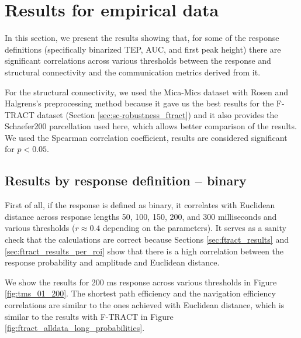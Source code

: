 \section{Results for empirical data}

In this section, we present the results showing that, for some of the response definitions (specifically binarized TEP, AUC, and first peak height) there are significant correlations across various thresholds between the response and structural connectivity and the communication metrics derived from it. 

For the structural connectivity, we used the Mica-Mics dataset with Rosen and Halgrens's preprocessing method because it gave us the best results for the F-TRACT dataset (Section \ref{sec:sc-robustness_ftract}) and it also provides the Schaefer200 parcellation used here, which allows better comparison of the results. We used the Spearman correlation coefficient, results are considered significant for $p<0.05$.

\subsection{Results by response definition -- binary}

First of all, if the response is defined as binary, it correlates with Euclidean distance across response lengths 50, 100, 150, 200, and 300 milliseconds and various thresholds ($r \approx 0.4$ depending on the parameters). It serves as a sanity check that the calculations are correct because Sections \ref{sec:ftract_results} and \ref{sec:ftract_results_per_roi} show that there is a high correlation between the response probability and amplitude and Euclidean distance. 

We show the results for 200 ms response across various thresholds in Figure \ref{fig:tms_01_200}. The shortest path efficiency and the navigation efficiency correlations are similar to the ones achieved with Euclidean distance, which is similar to the results with F-TRACT in Figure \ref{fig:ftract_alldata_long_probabilities}.

